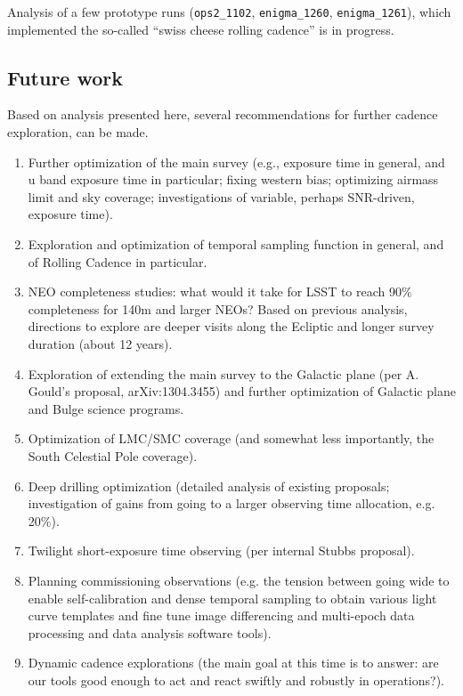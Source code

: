 Analysis of a few prototype runs (\texttt{ops2\_1102},
\texttt{enigma\_1260}, \texttt{enigma\_1261}), which implemented the
so-called ``swiss cheese rolling cadence'' is in progress.


\subsection{Future work}

Based on analysis presented here, several recommendations
for further cadence exploration, can be made.

\begin{enumerate}

\item Further optimization of the main survey (e.g., exposure time in
general, and u band exposure time in particular; fixing western bias;
optimizing airmass limit and sky coverage; investigations of variable,
perhaps SNR-driven, exposure time).

\item Exploration and optimization of temporal sampling function in
general, and of Rolling Cadence in particular.

\item NEO completeness studies: what would it take for LSST to reach
90\% completeness for 140m and larger NEOs?  Based on previous
analysis, directions to explore are deeper visits along the Ecliptic
and longer survey duration (about 12 years).

\item Exploration of extending the main survey to the Galactic plane
(per A. Gould's proposal, arXiv:1304.3455) and further optimization of
Galactic plane and Bulge science programs.

\item Optimization of LMC/SMC coverage (and somewhat less importantly,
the South Celestial Pole coverage).

\item Deep drilling optimization (detailed analysis of existing
proposals; investigation of gains from going to a larger observing
time allocation, e.g. 20\%).

\item Twilight short-exposure time observing (per internal Stubbs proposal).

\item Planning commissioning observations (e.g. the tension between
going wide to enable self-calibration and dense temporal sampling to
obtain various light curve templates and fine tune image differencing
and multi-epoch data processing and data analysis software tools).

\item Dynamic cadence explorations (the main goal at this time is to
answer: are our tools good enough to act and react swiftly and
robustly in operations?).

\end{enumerate}

